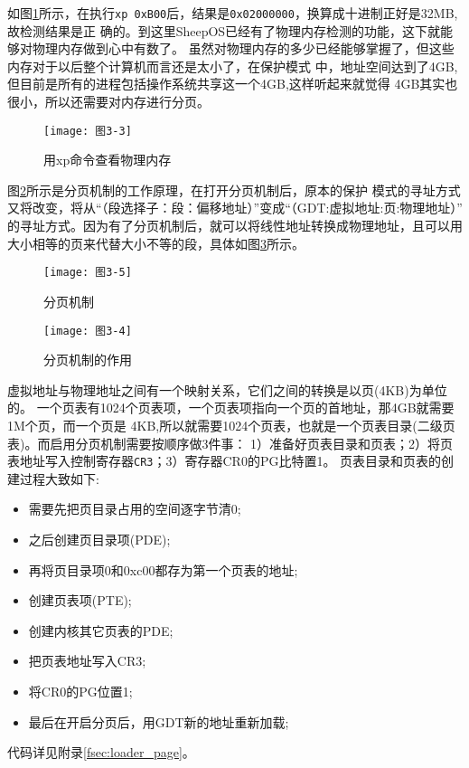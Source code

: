 如图\ref{fig:xp}所示，在执行\texttt{xp 0xB00}后，结果是\texttt{0x02000000}，换算成十进制正好是32MB,故检测结果是正
确的。到这里SheepOS已经有了物理内存检测的功能，这下就能够对物理内存做到心中有数了。
虽然对物理内存的多少已经能够掌握了，但这些内存对于以后整个计算机而言还是太小了，在保护模式
中，地址空间达到了4GB,但目前是所有的进程包括操作系统共享这一个4GB,这样听起来就觉得
4GB其实也很小，所以还需要对内存进行分页。

\begin{figure}
  \centering
  \texttt{[image: 图3-3]}
  \caption{用xp命令查看物理内存}
  \label{fig:xp}
\end{figure}

图\ref{fig:fenye}所示是分页机制的工作原理，在打开分页机制后，原本的保护
模式的寻址方式又将改变，将从“（段选择子：段：偏移地址）”变成“（GDT:虚拟地址:页:物理地址）”
的寻址方式。因为有了分页机制后，就可以将线性地址转换成物理地址，且可以用
大小相等的页来代替大小不等的段，具体如图\ref{fig:fenyezy}所示。

\begin{figure}
  \centering
  \texttt{[image: 图3-5]}
  \caption{分页机制}
  \label{fig:fenye}
\end{figure}

\begin{figure}[H]
  \centering
  \texttt{[image: 图3-4]}
  \caption{分页机制的作用}
  \label{fig:fenyezy}
\end{figure}

虚拟地址与物理地址之间有一个映射关系，它们之间的转换是以页(4KB)为单位的。
一个页表有1024个页表项，一个页表项指向一个页的首地址，那4GB就需要1M个页，而一个页是
4KB,所以就需要1024个页表，也就是一个页表目录(二级页表)。而启用分页机制需要按顺序做3件事：
1）准备好页表目录和页表；2）将页表地址写入控制寄存器\texttt{CR3}；3）寄存器CR0的PG比特置1。
页表目录和页表的创建过程大致如下:

\begin{itemize}
\item 需要先把页目录占用的空间逐字节清0;
\item 之后创建页目录项(PDE);
\item 再将页目录项0和0xc00都存为第一个页表的地址;
\item 创建页表项(PTE);
\item 创建内核其它页表的PDE;
\item 把页表地址写入CR3;
\item 将CR0的PG位置1;
\item 最后在开启分页后，用GDT新的地址重新加载;
\end{itemize}
代码详见附录\ref{fsec:loader_page}。

